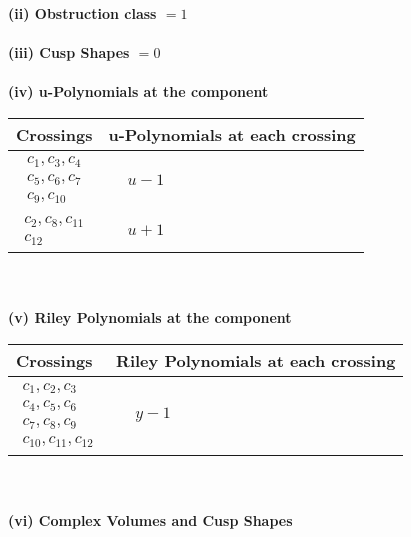 \documentclass[1p]{elsarticle_modified}
\theoremstyle{definition}
\begin{document}
\flushleft \textbf{(ii) Obstruction class $= 1$}\\~\\
\flushleft \textbf{(iii) Cusp Shapes $= 0$}\\~\\
\newpage\renewcommand{\arraystretch}{1}
\flushleft \textbf{(iv) u-Polynomials at the component}\newline \\
\begin{tabular}{m{50pt}|m{274pt}}
Crossings & \hspace{64pt}u-Polynomials at each crossing \\
\hline $$\begin{aligned}c_{1},c_{3},c_{4}\\c_{5},c_{6},c_{7}\\c_{9},c_{10}\end{aligned}$$&$\begin{aligned}
&u-1
\end{aligned}$\\
\hline $$\begin{aligned}c_{2},c_{8},c_{11}\\c_{12}\end{aligned}$$&$\begin{aligned}
&u+1
\end{aligned}$\\
\hline
\end{tabular}\\~\\
\newpage\renewcommand{\arraystretch}{1}
\flushleft \textbf{(v) Riley Polynomials at the component}\newline \\
\begin{tabular}{m{50pt}|m{274pt}}
Crossings & \hspace{64pt}Riley Polynomials at each crossing \\
\hline $$\begin{aligned}c_{1},c_{2},c_{3}\\c_{4},c_{5},c_{6}\\c_{7},c_{8},c_{9}\\c_{10},c_{11},c_{12}\end{aligned}$$&$\begin{aligned}
&y-1
\end{aligned}$\\
\hline
\end{tabular}\\~\\
\newpage\flushleft \textbf{(vi) Complex Volumes and Cusp Shapes}
\end{document}

